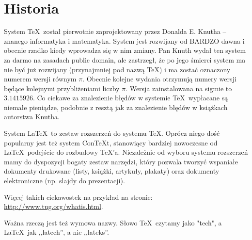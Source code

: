 \documentclass[12pt,a4paper]{article}
\theoremstyle{definition}
\begin{document}
\section{Historia}
System \TeX\ został pierwotnie zaprojektowany przez Donalda E. Knutha -- znanego informatyka i matematyka. System jest rozwijany od BARDZO dawna i obecnie rzadko kiedy wprowadza się w nim zmiany. Pan Knuth wydał ten system za darmo na zasadach public domain, ale zastrzegł, że po jego śmierci system ma nie być już rozwijany (przynajmniej pod nazwą \TeX) i ma zostać oznaczony numerem wersji równym $\pi$. Obecnie kolejne wydania otrzymują numery wersji będące kolejnymi przybliżeniami liczby $\pi$. Wersja zainstalowana na sigmie to $3.1415926$. Co ciekawe za znalezienie błędów w systemie \TeX\ wypłacane są niemałe pieniądze, podobnie z resztą jak za znalezienie błędów w książkach autorstwa Knutha. 

System \LaTeX\ to zestaw rozszerzeń do systemu \TeX. Oprócz niego dość popularny jest też system ConTeXt, stanowiący bardziej nowoczesne od \LaTeX\ podejście do rozbudowy \TeX'a. Niezależnie od wyboru systemu rozszerzeń mamy do dyspozycji bogaty zestaw narzędzi, który pozwala tworzyć wspaniałe dokumenty drukowane (listy, książki, artykuły, plakaty) oraz dokumenty elektroniczne (np. slajdy do prezentacji).  

Więcej takich ciekawostek na przykład na stronie: \url{http://www.tug.org/whatis.html}.

Ważna rzeczą jest też wymowa nazwy. Słowo \TeX\ czytamy jako "tech", a \LaTeX\ jak ,,latech'', a nie ,,lateks''.
\end{document}
